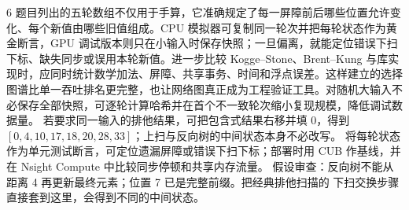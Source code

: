 \begin{solutionexercise}{6}
题目列出的五轮数组不仅用于手算，它准确规定了每一屏障前后哪些位置允许变化、每个新值由哪些旧值组成。CPU 模拟器可复制同一轮次并把每轮状态作为黄金断言，GPU 调试版本则只在小输入时保存快照；一旦偏离，就能定位错误下扫下标、缺失同步或误用本轮新值。进一步比较 Kogge--Stone、Brent--Kung 与库实现时，应同时统计数学加法、屏障、共享事务、时间和浮点误差。这样建立的选择图谱比单一吞吐排名更完整，也让网络图真正成为工程验证工具。对随机大输入不必保存全部快照，可逐轮计算哈希并在首个不一致轮次缩小复现规模，降低调试数据量。
\variantheading 若要求同一输入的排他结果，可把包含式结果右移并填 0，得到
$[0,4,10,17,18,20,28,33]$；上扫与反向树的中间状态本身不必改写。
\practiceheading 将每轮状态作为单元测试断言，可定位遗漏屏障或错误下扫下标；部署时用
CUB  作基线，并在 Nsight Compute 中比较同步停顿和共享内存流量。
假设审查：反向树不能从距离 4 再更新最终元素；位置 7 已是完整前缀。把经典排他扫描的
下扫交换步骤直接套到这里，会得到不同的中间状态。
\end{solutionexercise}

